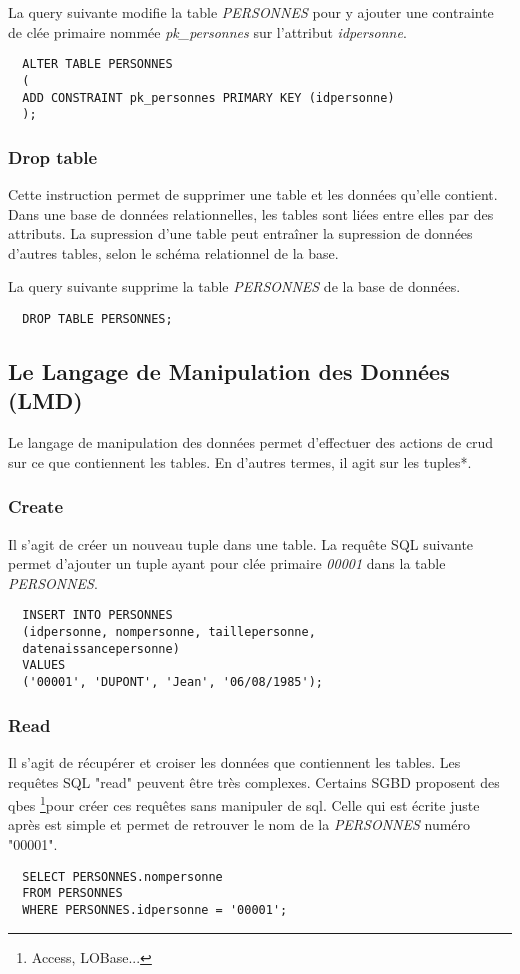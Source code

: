 La \gls{query} suivante modifie la table \textit{PERSONNES} pour y ajouter une contrainte de clée primaire nommée \textit{pk\_personnes} sur l'attribut \textit{idpersonne}.

\begin{lstlisting}
  ALTER TABLE PERSONNES
  (
  ADD CONSTRAINT pk_personnes PRIMARY KEY (idpersonne)
  );
\end{lstlisting}

\subsubsection{Drop table}
Cette instruction permet de supprimer une table et les données qu'elle contient.
Dans une base de données relationnelles, les tables sont liées entre elles par des attributs.
La supression d'une table peut entraîner la supression de données d'autres tables, selon le schéma relationnel de la base.

La \gls{query} suivante supprime la table \textit{PERSONNES} de la base de données.
\begin{lstlisting}
  DROP TABLE PERSONNES;
\end{lstlisting}

\subsection{Le Langage de Manipulation des Données (LMD)}
Le langage de manipulation des données permet d'effectuer des actions de \gls{crud} sur ce que contiennent les tables.
En d'autres termes, il agit sur les \glspl{tuple}*.

\subsubsection{Create}
Il s'agit de créer un nouveau tuple dans une table.
La requête SQL suivante permet d'ajouter un tuple ayant pour clée primaire \textit{00001} dans la table \textit{PERSONNES}.
\begin{lstlisting}
  INSERT INTO PERSONNES
  (idpersonne, nompersonne, taillepersonne,
  datenaissancepersonne)
  VALUES
  ('00001', 'DUPONT', 'Jean', '06/08/1985');
\end{lstlisting}

\subsubsection{Read}
Il s'agit de récupérer et croiser les données que contiennent les tables.
Les requêtes SQL  "read" peuvent être très complexes.
Certains SGBD proposent des \glspl{qbe}
\footnote{Access, LOBase...}pour créer ces requêtes sans manipuler de \gls{sql}.
Celle qui est écrite juste après est simple et permet de retrouver le nom de la \textit{PERSONNES} numéro "00001".
\begin{lstlisting}
  SELECT PERSONNES.nompersonne
  FROM PERSONNES
  WHERE PERSONNES.idpersonne = '00001';
\end{lstlisting}

